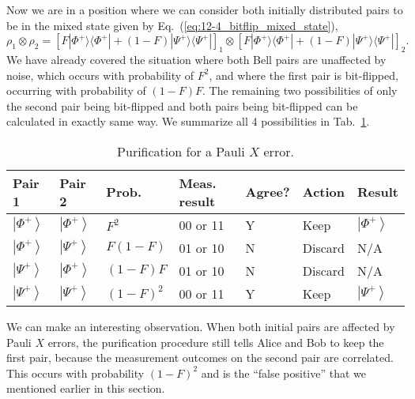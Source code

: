 Now we are in a position where we can consider both initially distributed pairs to be in the mixed state given by Eq.~(\ref{eq:12-4_bitflip_mixed_state}),
\begin{equation}
    \rho_1 \otimes \rho_2 = \left[ F |\Phi^+\rangle \langle\Phi^+| + (1 - F) |\Psi^+\rangle \langle\Psi^+| \right]_1 \otimes \left[ F |\Phi^+\rangle \langle\Phi^+| + (1 - F) |\Psi^+\rangle \langle\Psi^+| \right]_2.
\end{equation}
We have already covered the situation where both Bell pairs are unaffected by noise, which occurs with probability of $F^2$, and where the first pair is bit-flipped, occurring with probability of $(1-F)F$.
The remaining two possibilities of only the second pair being bit-flipped and both pairs being bit-flipped can be calculated in exactly same way.
We summarize all 4 possibilities in Tab.~\ref{tab:12-4_purification_X_error}.
\begin{table}[t]
    \centering
    \begin{tabular}{|l|l|l|l|l|l|l|}
        \hline Pair 1 & Pair 2 & Prob. & Meas. result & Agree? & Action & Result \\
        \hline$\left|\Phi^{+}\right\rangle$ & $\left|\Phi^{+}\right\rangle$ & $F^{2}$ & 00 or 11 & Y & Keep & $\left|\Phi^{+}\right\rangle$ \\
        \hline$\left|\Phi^{+}\right\rangle$ & $\left|\Psi^{+}\right\rangle$ & $F(1-F)$ & 01 or 10 & N & Discard & N/A \\
        \hline$\left|\Psi^{+}\right\rangle$ & $\left|\Phi^{+}\right\rangle$ & $(1-F) F$ & 01 or 10 & N & Discard & N/A \\
        \hline$\left|\Psi^{+}\right\rangle$ & $\left|\Psi^{+}\right\rangle$ & $(1-F)^{2}$ & 00 or 11 & Y & Keep & $\left|\Psi^{+}\right\rangle$ \\
        \hline
    \end{tabular}
    \caption[X error purification]{Purification for a Pauli $X$ error.}
    \label{tab:12-4_purification_X_error}
\end{table}

We can make an interesting observation.
When both initial pairs are affected by Pauli $X$ errors, the purification procedure still tells Alice and Bob to keep the first pair, because the measurement outcomes on the second pair are correlated.
This occurs with probability $(1-F)^2$ and is the ``false positive'' that we mentioned earlier in this section.

